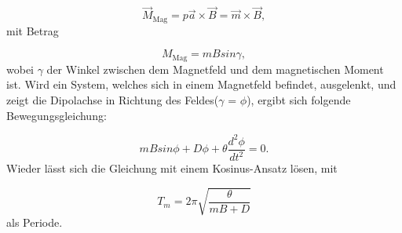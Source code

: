 \begin{equation}
  \vec{M}_\text{Mag} = p \vec{a} \times \vec{B} = \vec{m} \times \vec{B} ,
\end{equation}
mit Betrag

\begin{equation}
 M_\text{Mag} = m B sin\gamma ,
\end{equation}
wobei $\gamma$ der Winkel zwischen dem Magnetfeld und dem magnetischen Moment ist. Wird ein System, welches sich in einem Magnetfeld befindet, ausgelenkt, und zeigt die Dipolachse in Richtung des Feldes($\gamma$ = $\phi$), ergibt sich folgende Bewegungsgleichung:

\begin{equation}
  m B sin\phi + D \phi + \theta \frac{d^{2}\phi}{dt^{2}} = 0 .
\end{equation}
Wieder lässt sich die Gleichung mit einem Kosinus-Ansatz lösen, mit

\begin{equation}
  T_m = 2\pi \sqrt{\frac{\theta}{m B + D}}
\end{equation}
als Periode.



